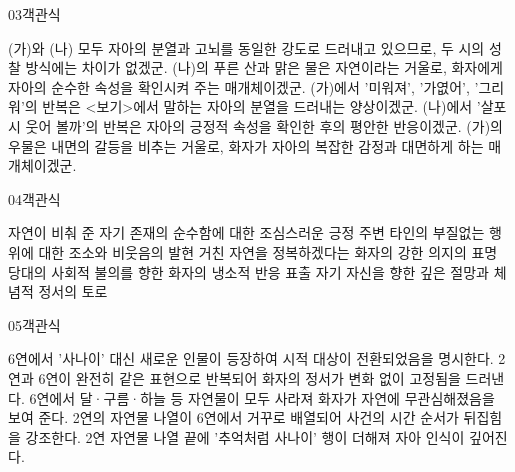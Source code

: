\documentclass[fs85,seriesWit]{korfarm-base}
\begin{document}
\begin{kfQBlock}{03}{객관식}
\begin{kfChoices}
\kfChoice (가)와 (나) 모두 자아의 분열과 고뇌를 동일한 강도로 드러내고 있으므로, 두 시의 성찰 방식에는 차이가 없겠군.
\kfChoice (나)의 푸른 산과 맑은 물은 자연이라는 거울로, 화자에게 자아의 순수한 속성을 확인시켜 주는 매개체이겠군.
\kfChoice (가)에서 '미워져', '가엾어', '그리워'의 반복은 <보기>에서 말하는 자아의 분열을 드러내는 양상이겠군.
\kfChoice (나)에서 '살포시 웃어 볼까'의 반복은 자아의 긍정적 속성을 확인한 후의 평안한 반응이겠군.
\kfChoice (가)의 우물은 내면의 갈등을 비추는 거울로, 화자가 자아의 복잡한 감정과 대면하게 하는 매개체이겠군.
\end{kfChoices}
\end{kfQBlock}

\begin{kfQBlock}{04}{객관식}
\begin{kfChoices}
\kfChoice 자연이 비춰 준 자기 존재의 순수함에 대한 조심스러운 긍정
\kfChoice 주변 타인의 부질없는 행위에 대한 조소와 비웃음의 발현
\kfChoice 거친 자연을 정복하겠다는 화자의 강한 의지의 표명
\kfChoice 당대의 사회적 불의를 향한 화자의 냉소적 반응 표출
\kfChoice 자기 자신을 향한 깊은 절망과 체념적 정서의 토로
\end{kfChoices}
\end{kfQBlock}

\begin{kfQBlock}{05}{객관식}
\begin{kfChoices}
\kfChoice 6연에서 '사나이' 대신 새로운 인물이 등장하여 시적 대상이 전환되었음을 명시한다.
\kfChoice 2연과 6연이 완전히 같은 표현으로 반복되어 화자의 정서가 변화 없이 고정됨을 드러낸다.
\kfChoice 6연에서 달·구름·하늘 등 자연물이 모두 사라져 화자가 자연에 무관심해졌음을 보여 준다.
\kfChoice 2연의 자연물 나열이 6연에서 거꾸로 배열되어 사건의 시간 순서가 뒤집힘을 강조한다.
\kfChoice 2연 자연물 나열 끝에 '추억처럼 사나이' 행이 더해져 자아 인식이 깊어진다.
\end{kfChoices}
\end{kfQBlock}
\end{document}
